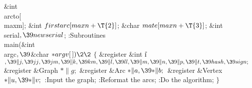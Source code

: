 \&{int} \\{arcto}[\\{maxm}];\6
\&{int} ${}\\{firstarc}[\\{maxn}+\T{2}]{}$;\6
\&{char} ${}\\{mate}[\\{maxn}+\T{3}]{}$;\6
\&{int} \\{serial}${},\39\\{newserial}{}$;\7
:Subroutines\X\7
\1\1\\{main}(\&{int} \\{argc}${},\39{}$\&{char} ${}{*}\\{argv}[\,])\2\2{}$\6
${}\{{}$\1\6
\&{register} \&{int} \|i${},\39\|j,\39\\{jj},\39\\{jm},\39\|k,\39\\{km},\39\|l,%
\39\\{ll},\39\|m,\39\|n,\39\|p,\39\|t,\39\\{hash},\39\\{sign};{}$\6
\&{register} \&{Graph} ${}{*}\|g;{}$\6
\&{register} \&{Arc} ${}{*}\|a,\39{*}\|b;{}$\6
\&{register} \&{Vertex} ${}{*}\|u,\39{*}\|v;{}$\7
:Input the graph\X;\6
:Reformat the arcs\X;\6
:Do the algorithm\X;\6
\4${}\}{}$\2\par
\fi

